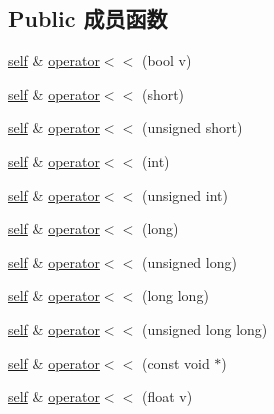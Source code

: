 \subsection*{Public 成员函数}
\begin{DoxyCompactItemize}
\item 
\hyperlink{classmuduo_1_1LogStream_a85e87a809801549b949fc3f7f8c816bd}{self} \& \hyperlink{classmuduo_1_1LogStream_a00bf7c971fab473cfa7dd9cd23aaa955}{operator$<$$<$} (bool v)
\item 
\hyperlink{classmuduo_1_1LogStream_a85e87a809801549b949fc3f7f8c816bd}{self} \& \hyperlink{classmuduo_1_1LogStream_af71df134185fc4377c2951e98856f40c}{operator$<$$<$} (short)
\item 
\hyperlink{classmuduo_1_1LogStream_a85e87a809801549b949fc3f7f8c816bd}{self} \& \hyperlink{classmuduo_1_1LogStream_ac9b83ea3d0dd8ba1984a1ac25ef4347c}{operator$<$$<$} (unsigned short)
\item 
\hyperlink{classmuduo_1_1LogStream_a85e87a809801549b949fc3f7f8c816bd}{self} \& \hyperlink{classmuduo_1_1LogStream_ab42228f66285c6f8c9fc023b96ce4193}{operator$<$$<$} (int)
\item 
\hyperlink{classmuduo_1_1LogStream_a85e87a809801549b949fc3f7f8c816bd}{self} \& \hyperlink{classmuduo_1_1LogStream_ae364fc30b040eeeee5745f77fc4d3ae1}{operator$<$$<$} (unsigned int)
\item 
\hyperlink{classmuduo_1_1LogStream_a85e87a809801549b949fc3f7f8c816bd}{self} \& \hyperlink{classmuduo_1_1LogStream_af116de5225395964ef2d725eda62e698}{operator$<$$<$} (long)
\item 
\hyperlink{classmuduo_1_1LogStream_a85e87a809801549b949fc3f7f8c816bd}{self} \& \hyperlink{classmuduo_1_1LogStream_abd11856c25c666a1871d6f41613cefc2}{operator$<$$<$} (unsigned long)
\item 
\hyperlink{classmuduo_1_1LogStream_a85e87a809801549b949fc3f7f8c816bd}{self} \& \hyperlink{classmuduo_1_1LogStream_a0dcf5bd751c723a54b9a7f0e90b918b0}{operator$<$$<$} (long long)
\item 
\hyperlink{classmuduo_1_1LogStream_a85e87a809801549b949fc3f7f8c816bd}{self} \& \hyperlink{classmuduo_1_1LogStream_a6486d4ded718af9b097956ace2d1bc08}{operator$<$$<$} (unsigned long long)
\item 
\hyperlink{classmuduo_1_1LogStream_a85e87a809801549b949fc3f7f8c816bd}{self} \& \hyperlink{classmuduo_1_1LogStream_a4c9336e5747e63dcb3d62883bdfb69e8}{operator$<$$<$} (const void $\ast$)
\item 
\hyperlink{classmuduo_1_1LogStream_a85e87a809801549b949fc3f7f8c816bd}{self} \& \hyperlink{classmuduo_1_1LogStream_af2e8316650b99036d696fcc0da89bdbe}{operator$<$$<$} (float v)

\end{DoxyCompactItemize}
